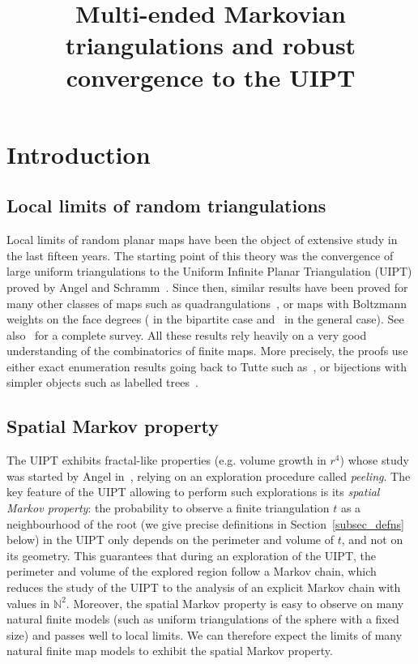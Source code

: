\documentclass[AHL,Unicode,longabstracts,published]{cedram}
\title[Multi-ended Markovian triangulations]{Multi-ended Markovian triangulations and robust convergence to the UIPT}
\author[\initial{T.} \lastname{Budzinski}]{\firstname{Thomas} \lastname{Budzinski}}
\newcommand{\N}{\mathbb{N}}
\begin{document}
\maketitle

\section{Introduction}

\subsection*{Local limits of random triangulations}
Local limits of random planar maps have been the object of extensive study in the last fifteen years. The starting point of this theory was the convergence of large uniform triangulations to the Uniform Infinite Planar Triangulation (UIPT) proved by Angel and Schramm~\cite{AS03}. Since then, similar results have been proved for many other classes of maps such as quadrangulations~\cite{CD06}, or maps with Boltzmann weights on the face degrees (\cite{BS13} in the bipartite case and~\cite{St18} in the general case). See also~\cite{C-StFlour} for a complete survey. All these results rely heavily on a very good understanding of the combinatorics of finite maps. More precisely, the proofs use either exact enumeration results going back to Tutte such as~\cite{Tut62}, or bijections with simpler objects such as labelled trees~\cite{CV81}.

\subsection*{Spatial Markov property}
The UIPT exhibits fractal-like properties (e.g. volume growth in $r^4$) whose study was started by Angel in~\cite{Ang03}, relying on an exploration procedure called \emph{peeling}. The key feature of the UIPT allowing to perform such explorations is its \emph{spatial Markov property}: the probability to observe a finite triangulation $t$ as a neighbourhood of the root (we give precise definitions in Section~\ref{subsec_defns} below) in the UIPT only depends on the perimeter and volume of $t$, and not on its geometry. This guarantees that during an exploration of the UIPT, the perimeter and volume of the explored region follow a Markov chain, which reduces the study of the UIPT to the analysis of an explicit Markov chain with values in $\N^2$. Moreover, the spatial Markov property is easy to observe on many natural finite models (such as uniform triangulations of the sphere with a fixed size) and passes well to local limits. We can therefore expect the limits of many natural finite map models to exhibit the spatial Markov property.
\end{document}
